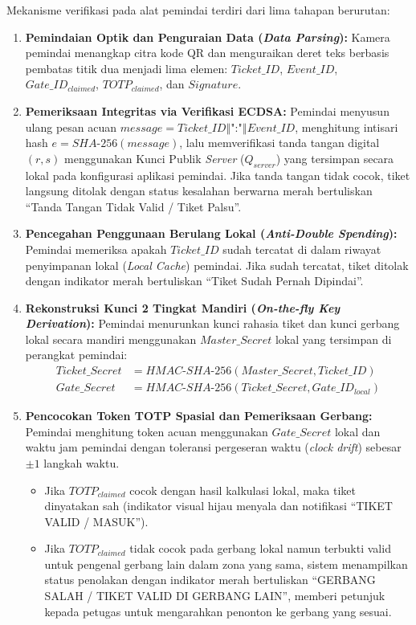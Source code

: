 Mekanisme verifikasi pada alat pemindai terdiri dari lima tahapan berurutan:
\begin{enumerate}
    \item \textbf{Pemindaian Optik dan Penguraian Data (\textit{Data Parsing}):} Kamera pemindai menangkap citra kode QR dan menguraikan deret teks berbasis pembatas titik dua menjadi lima elemen: $Ticket\_ID$, $Event\_ID$, $Gate\_ID_{claimed}$, $TOTP_{claimed}$, dan $Signature$.
    \item \textbf{Pemeriksaan Integritas via Verifikasi ECDSA:} Pemindai menyusun ulang pesan acuan $message = Ticket\_ID \mathbin{\Vert} \text{":"} \mathbin{\Vert} Event\_ID$, menghitung intisari hash $e = SHA\text{-}256(message)$, lalu memverifikasi tanda tangan digital $(r, s)$ menggunakan Kunci Publik \textit{Server} ($Q_{server}$) yang tersimpan secara lokal pada konfigurasi aplikasi pemindai. Jika tanda tangan tidak cocok, tiket langsung ditolak dengan status kesalahan berwarna merah bertuliskan ``Tanda Tangan Tidak Valid / Tiket Palsu''.
    \item \textbf{Pencegahan Penggunaan Berulang Lokal (\textit{Anti-Double Spending}):} Pemindai memeriksa apakah $Ticket\_ID$ sudah tercatat di dalam riwayat penyimpanan lokal (\textit{Local Cache}) pemindai. Jika sudah tercatat, tiket ditolak dengan indikator merah bertuliskan ``Tiket Sudah Pernah Dipindai''.
    \item \textbf{Rekonstruksi Kunci 2 Tingkat Mandiri (\textit{On-the-fly Key Derivation}):} Pemindai menurunkan kunci rahasia tiket dan kunci gerbang lokal secara mandiri menggunakan $Master\_Secret$ lokal yang tersimpan di perangkat pemindai:
    \begin{align}
        Ticket\_Secret &= HMAC\text{-}SHA\text{-}256(Master\_Secret, Ticket\_ID) \\
        Gate\_Secret &= HMAC\text{-}SHA\text{-}256(Ticket\_Secret, Gate\_ID_{local})
    \end{align}
    \item \textbf{Pencocokan Token TOTP Spasial dan Pemeriksaan Gerbang:} Pemindai menghitung token acuan menggunakan $Gate\_Secret$ lokal dan waktu jam pemindai dengan toleransi pergeseran waktu (\textit{clock drift}) sebesar $\pm 1$ langkah waktu.
    \begin{itemize}
        \item Jika $TOTP_{claimed}$ cocok dengan hasil kalkulasi lokal, maka tiket dinyatakan sah (indikator visual hijau menyala dan notifikasi ``TIKET VALID / MASUK'').
        \item Jika $TOTP_{claimed}$ tidak cocok pada gerbang lokal namun terbukti valid untuk pengenal gerbang lain dalam zona yang sama, sistem menampilkan status penolakan dengan indikator merah bertuliskan ``GERBANG SALAH / TIKET VALID DI GERBANG LAIN'', memberi petunjuk kepada petugas untuk mengarahkan penonton ke gerbang yang sesuai.

\end{itemize}
\end{enumerate}
